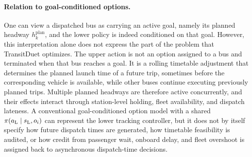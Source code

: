 \paragraph{Relation to goal-conditioned options.}
One can view a dispatched bus as carrying an active goal, namely its planned headway $h^{\mathrm{plan}}_k$, and the lower policy is indeed conditioned on that goal.
However, this interpretation alone does not express the part of the problem that TransitDuet optimizes.
The upper action is not an option assigned to a bus and terminated when that bus reaches a goal. It is a rolling timetable adjustment that determines the planned launch time of a future trip, sometimes before the corresponding vehicle is available, while other buses continue executing previously planned trips.
Multiple planned headways are therefore active concurrently, and their effects interact through station-level holding, fleet availability, and dispatch lateness.
A conventional goal-conditioned option model with a shared $\pi(a_{\mathrm{L}}\mid s_{\mathrm{L}},o_i)$ can represent the lower tracking controller, but it does not by itself specify how future dispatch times are generated, how timetable feasibility is audited, or how credit from passenger wait, onboard delay, and fleet overshoot is assigned back to asynchronous dispatch-time decisions.
